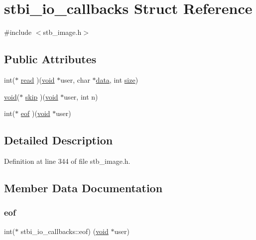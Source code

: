 \hypertarget{structstbi__io__callbacks}{}\section{stbi\+\_\+io\+\_\+callbacks Struct Reference}
\label{structstbi__io__callbacks}


{\ttfamily \#include $<$stb\+\_\+image.\+h$>$}

\subsection*{Public Attributes}
\begin{DoxyCompactItemize}
\item 
int($\ast$ \mbox{\hyperlink{structstbi__io__callbacks_a623e46b3a2a019611601409926283a88}{read}} )(\mbox{\hyperlink{glad_8h_a950fc91edb4504f62f1c577bf4727c29}{void}} $\ast$user, char $\ast$\mbox{\hyperlink{glad_8h_a0f78eecb0891cce3bdfc815b971866a1}{data}}, int \mbox{\hyperlink{glad_8h_a79ef9eb3e59c4bb34c4b9fbeb8d28ff7}{size}})
\item 
\mbox{\hyperlink{glad_8h_a950fc91edb4504f62f1c577bf4727c29}{void}}($\ast$ \mbox{\hyperlink{structstbi__io__callbacks_a257aac5480a90a6c4b8fbe86c1b01068}{skip}} )(\mbox{\hyperlink{glad_8h_a950fc91edb4504f62f1c577bf4727c29}{void}} $\ast$user, int n)
\item 
int($\ast$ \mbox{\hyperlink{structstbi__io__callbacks_a319639db2f76e715eed7a7a974136832}{eof}} )(\mbox{\hyperlink{glad_8h_a950fc91edb4504f62f1c577bf4727c29}{void}} $\ast$user)
\end{DoxyCompactItemize}


\subsection{Detailed Description}


Definition at line 344 of file stb\+\_\+image.\+h.



\subsection{Member Data Documentation}
\mbox{\label{structstbi__io__callbacks_a319639db2f76e715eed7a7a974136832}} 
\subsubsection{\texorpdfstring{eof}{eof}}
{\footnotesize\ttfamily int($\ast$ stbi\+\_\+io\+\_\+callbacks\+::eof) (\mbox{\hyperlink{glad_8h_a950fc91edb4504f62f1c577bf4727c29}{void}} $\ast$user)}



